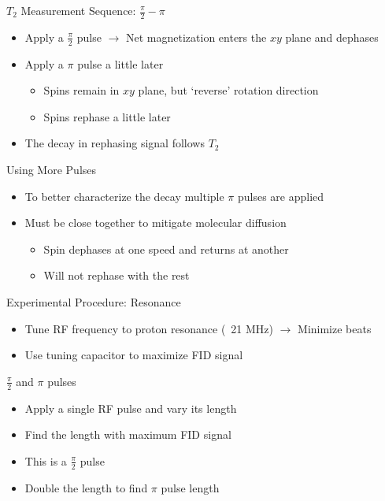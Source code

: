 \documentclass[aspectratio=169,xcolor=dvipsnames]{beamer}
\newcommand{\halfpi}{\frac{\pi}{2}}
\begin{document}
\begin{frame}{$T_2$ Measurement Sequence: $\halfpi-\pi$}
    \begin{itemize}
        \item Apply a $\halfpi$ pulse $\rightarrow$ Net magnetization enters the $xy$ plane and dephases 
        \item Apply a $\pi$ pulse a little later
            \begin{itemize}
                \item Spins remain in $xy$ plane, but `reverse' rotation direction
                \item Spins rephase a little later 
            \end{itemize}
        \item The decay in rephasing signal follows $T_2$
    \end{itemize}
\end{frame}

\begin{frame}{Using More Pulses}
    \begin{itemize}
        \item To better characterize the decay multiple $\pi$ pulses are applied
        \item Must be close together to mitigate molecular diffusion
        \begin{itemize}
            \item Spin dephases at one speed and returns at another 
            \item Will not rephase with the rest
        \end{itemize}
    \end{itemize}
\end{frame}

\begin{frame}{Experimental Procedure: Resonance}
    \begin{itemize}
        \item Tune RF frequency to proton resonance (~21 MHz) $\rightarrow$ Minimize beats
        \item Use tuning capacitor to maximize FID signal
    \end{itemize}
\end{frame}

\begin{frame}{$\halfpi$ and $\pi$ pulses}
    \begin{itemize}
        \item Apply a single RF pulse and vary its length
        \item Find the length with maximum FID signal
        \item This is a $\halfpi$ pulse
        \item Double the length to find $\pi$ pulse length
    \end{itemize}
\end{frame}
\end{document}
